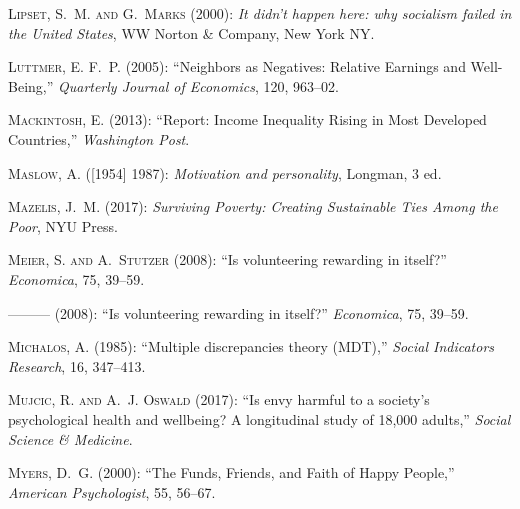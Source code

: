 \documentclass[10pt, letterpaper]{article}
\begin{document}
\begin{spacing}{1.4}
\begin{thebibliography}{87}
\textsc{Lipset, S.~M. and G.~Marks} (2000): \emph{It didn't happen here: why
  socialism failed in the United States}, WW Norton \& Company, New York NY.

\textsc{Luttmer, E. F.~P.} (2005): \enquote{Neighbors as Negatives: Relative
  Earnings and Well-Being,} \emph{Quarterly Journal of Economics}, 120,
  963--02.

\textsc{Mackintosh, E.} (2013): \enquote{Report: Income Inequality Rising in
  Most Developed Countries,} \emph{Washington Post}.

\textsc{Maslow, A.} ([1954] 1987): \emph{{Motivation and personality}},
  Longman, 3 ed.

\textsc{Mazelis, J.~M.} (2017): \emph{Surviving Poverty: Creating Sustainable
  Ties Among the Poor}, NYU Press.

\textsc{Meier, S. and A.~Stutzer} (2008{}): \enquote{Is
  volunteering rewarding in itself?} \emph{Economica}, 75, 39--59.

---\hspace{-.1pt}---\hspace{-.1pt}--- (2008{}): \enquote{Is
  volunteering rewarding in itself?} \emph{Economica}, 75, 39--59.

\textsc{Michalos, A.} (1985): \enquote{Multiple discrepancies theory (MDT),}
  \emph{Social Indicators Research}, 16, 347--413.

\textsc{Mujcic, R. and A.~J. Oswald} (2017): \enquote{Is envy harmful to a
  society's psychological health and wellbeing? A longitudinal study of 18,000
  adults,} \emph{Social Science \& Medicine}.

\textsc{Myers, D.~G.} (2000): \enquote{The Funds, Friends, and Faith of Happy
  People,} \emph{American Psychologist}, 55, 56--67.


\end{thebibliography}
\end{spacing}
\end{document}
